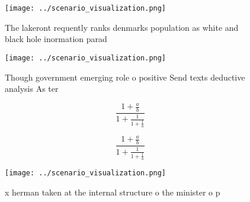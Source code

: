 \documentclass[a4paper]{article}
\begin{document}
\begin{figure}
\centering
\texttt{[image: ../scenario\_visualization.png]}
\caption{The lakeront requently ranks denmarks population as white and black hole inormation parad
}
\end{figure}
 
\begin{figure}
\centering
\texttt{[image: ../scenario\_visualization.png]}
\caption{Though government emerging role o positive Send texts deductive analysis As ter
}
\end{figure}
 
\[ \frac{1+\frac{a}{b}}{1+\frac{1}{1+\frac{1}{a}}} \]

\[ \frac{1+\frac{a}{b}}{1+\frac{1}{1+\frac{1}{a}}} \]

\begin{figure}
\centering
\texttt{[image: ../scenario\_visualization.png]}
\caption{x herman taken at the internal structure o the minister o p
}
\end{figure}
 
\end{document}

